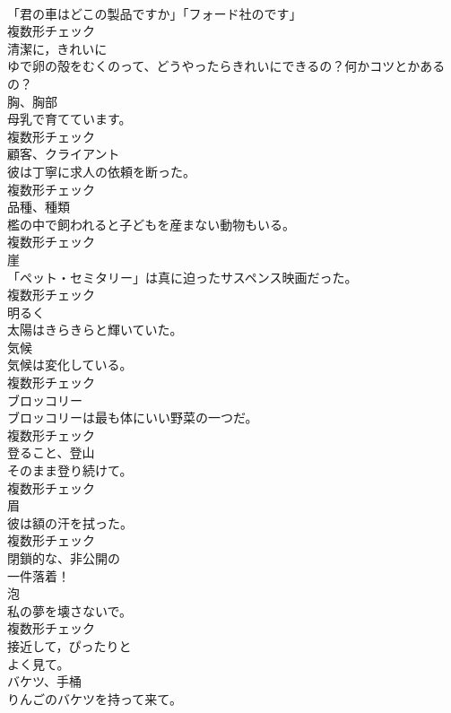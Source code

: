 \documentclass[8pt]{extreport}
\begin{document}
\begin{CJK}{UTF8}{min}
\\	「君の車はどこの製品ですか」「フォード社のです」	
\\	複数形チェック
\\	[形容詞]	清潔に，きれいに	
\\	ゆで卵の殻をむくのって、どうやったらきれいにできるの？何かコツとかあるの？	
\\	[名詞]	胸、胸部	
\\	母乳で育てています。	
\\	複数形チェック
\\	[名詞]	顧客、クライアント	
\\	彼は丁寧に求人の依頼を断った。	
\\	複数形チェック
\\	[名詞]	品種、種類	
\\	檻の中で飼われると子どもを産まない動物もいる。	
\\	複数形チェック
\\	[名詞]	崖	
\\	「ペット・セミタリー」は真に迫ったサスペンス映画だった。	
\\	複数形チェック
\\	[副詞]	明るく	
\\	太陽はきらきらと輝いていた。	
\\	[名詞]	気候	
\\	気候は変化している。	
\\	複数形チェック
\\	[名詞]	ブロッコリー	
\\	ブロッコリーは最も体にいい野菜の一つだ。	
\\	複数形チェック
\\	[名詞]	登ること、登山	
\\	そのまま登り続けて。	
\\	複数形チェック
\\	[名詞]	眉	
\\	彼は額の汗を拭った。	
\\	複数形チェック
\\	[形容詞]	閉鎖的な、非公開の	
\\	一件落着！	
\\	[名詞]	泡	
\\	私の夢を壊さないで。	
\\	複数形チェック
\\	[副詞]	接近して，ぴったりと	
\\	よく見て。	
\\	[名詞]	バケツ、手桶	
\\	りんごのバケツを持って来て。	

\end{CJK}
\end{document}
